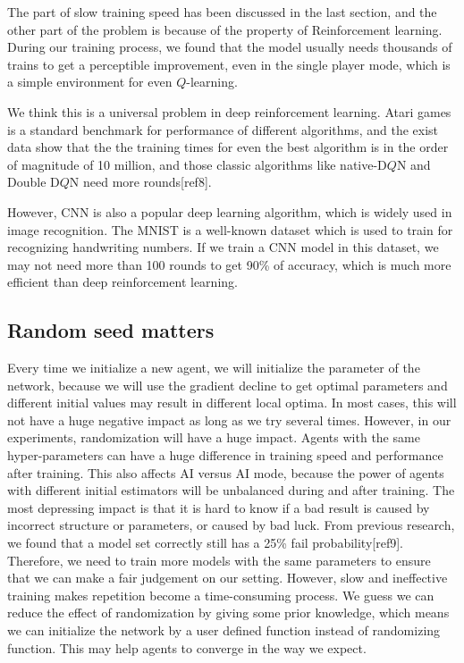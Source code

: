 \documentclass[12pt]{article}
\begin{document}
The part of slow training speed has been discussed in the last section, and the other part of the problem is because of the property of Reinforcement learning. During our training process, we found that the model usually needs thousands of trains to get a perceptible improvement, even in the single player mode, which is a simple environment for even $Q$-learning.

We think this is a universal problem in deep reinforcement learning. Atari games is a standard benchmark for performance of different algorithms, and the exist data show that the the training times for even the best algorithm is in the order of magnitude of 10 million, and those classic algorithms like native-D$Q$N and Double D$Q$N need more rounds[ref8].

However, CNN is also a popular deep learning algorithm, which is widely used in image recognition. The MNIST is a well-known dataset which is used to train for recognizing handwriting numbers. If we train a CNN model in this dataset, we may not need more than 100 rounds to get 90\% of accuracy, which is much more efficient than deep reinforcement learning.

\subsection{Random seed matters}
Every time  we initialize a new agent, we will initialize the parameter of the network, because we will use the gradient decline to get optimal parameters and different initial values may result in different local optima. In most cases, this will not have a huge negative impact as long as we try several times.
However, in our experiments, randomization will have a huge impact. Agents with the same hyper-parameters can have a huge difference in training speed and  performance after training. This also affects AI versus AI mode, because the power of agents with different initial estimators will be unbalanced during and after training.
The most depressing impact is that it is hard to know if a bad result is caused by incorrect structure or parameters, or caused by bad luck. From previous research, we found that a model set correctly still has a 25\% fail probability[ref9]. Therefore, we need to train more models with the same parameters to ensure that we can make a fair judgement on our setting. However, slow and ineffective training makes repetition become a time-consuming process.
We guess we can reduce the effect of randomization by giving some prior knowledge, which means we can initialize the network by a user defined function instead of randomizing function. This may help agents to converge in the way we expect.
\end{document}
